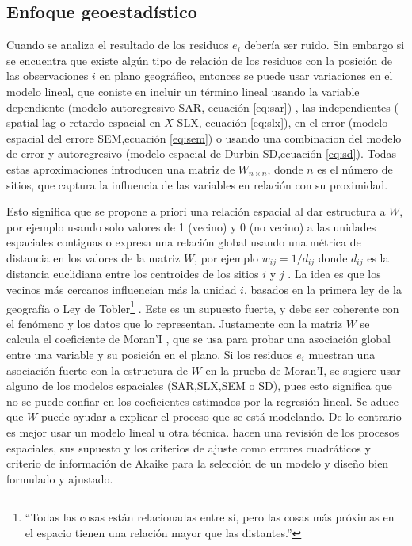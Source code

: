 \documentclass[12pt,]{book}
\let\rmarkdownfootnote\footnote%
\def\footnote{\protect\rmarkdownfootnote}
\begin{document}
\subsection{Enfoque geoestadístico}\label{enfoque-geoestadistico}

Cuando se analiza el resultado de los residuos \(e_i\) debería ser
ruido. Sin embargo si se encuentra que existe algún tipo de relación de
los residuos con la posición de las observaciones \(i\) en plano
geográfico, entonces se puede usar variaciones en el modelo lineal, que
coniste en incluir un término lineal usando la variable dependiente
(modelo autoregresivo SAR, ecuación \eqref{eq:sar}) , las independientes (
spatial lag o retardo espacial en \(X\) SLX, ecuación \eqref{eq:slx}), en
el error (modelo espacial del errore SEM,ecuación \eqref{eq:sem}) o usando
una combinacion del modelo de error y autoregresivo (modelo espacial de
Durbin SD,ecuación \eqref{eq:sd}). Todas estas aproximaciones introducen
una matriz de \(W_{n\times n}\), donde \(n\) es el número de sitios, que
captura la influencia de las variables en relación con su proximidad.

Esto significa que se propone a priori una relación espacial al dar
estructura a \(W\), por ejemplo usando solo valores de 1 (vecino) y 0
(no vecino) a las unidades espaciales contiguas o expresa una relación
global usando una métrica de distancia en los valores de la matriz
\(W\), por ejemplo \(w_{ij}= 1/d_{ij}\) donde \(d_{ij}\) es la distancia
euclidiana entre los centroides de los sitios \(i\) y \(j\) . La idea es
que los vecinos más cercanos influencian más la unidad \(i\), basados en
la primera ley de la geografía o Ley de Tobler\footnote{``Todas las
  cosas están relacionadas entre sí, pero las cosas más próximas en el
  espacio tienen una relación mayor que las distantes.''}
\citep{tobler1970computer}. Este es un supuesto fuerte, y debe ser
coherente con el fenómeno y los datos que lo representan. Justamente con
la matriz \(W\) se calcula el coeficiente de Moran'I
\citep{moran1950notes}, que se usa para probar una asociación global
entre una variable y su posición en el plano. Si los residuos \(e_i\)
muestran una asociación fuerte con la estructura de \(W\) en la prueba
de Moran'I, se sugiere usar alguno de los modelos espaciales
(SAR,SLX,SEM o SD), pues esto significa que no se puede confiar en los
coeficientes estimados por la regresión lineal. Se aduce que \(W\) puede
ayudar a explicar el proceso que se está modelando. De lo contrario es
mejor usar un modelo lineal u otra técnica.
\citep{paez_spatial_2005, kissling_spatial_2008, anselin_under_2002}
hacen una revisión de los procesos espaciales, sus supuesto y los
criterios de ajuste como errores cuadráticos y criterio de información
de Akaike para la selección de un modelo y diseño bien formulado y
ajustado.
\end{document}
